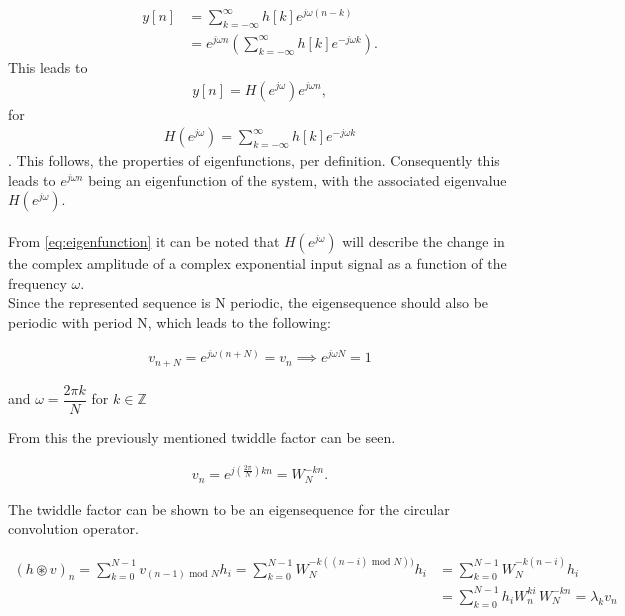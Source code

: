 \begin{align*}
y[n] 
&= \sum_{k=-\infty}^{\infty} h[k]e^{j\omega(n-k)} \nonumber \\ 
&= e^{j\omega n} \left(\sum_{k=-\infty}^{\infty} h[k]e^{-j\omega k} \right).
\end{align*}
This leads to
\begin{align}\label{eq:eigenfunction}
y[n] = H(e^{j \omega}) e^{j\omega n},
\end{align}
for
\begin{align*}
H(e^{j\omega}) = \sum_{k=-\infty}^{\infty} h[k]e^{-j\omega k} 
\end{align*}.
This follows, the properties of eigenfunctions, per definition.
Consequently this leads to $e^{j\omega n}$ being an eigenfunction of the system, with the associated eigenvalue $H(e^{j\omega})$.
\\\\
From \eqref{eq:eigenfunction} it can be noted that $H(e^{j\omega})$ will describe the change in the complex amplitude of a complex exponential input signal as a function of the frequency $\omega$. \cite{DTSP} 
\\
Since the represented sequence is N periodic, the eigensequence should also be periodic with period N, which leads to the following:

\begin{align*}
	v_{n+N} = e^{j\omega (n+N)} = v_n \implies e^{j\omega N} = 1
\end{align*}

and $\omega = \dfrac{2 \pi k}{N}$ for $k \in \mathbb{Z}$

From this the previously mentioned twiddle factor can be seen.

\begin{align*}
	v_n = e^{j(\frac{2\pi}{N}) kn} = W_N^{-kn}.
\end{align*}\cite{FSP}

The twiddle factor can be shown to be an eigensequence for the circular convolution operator.

\begin{align*}
	(h\circledast v)_n 
	= \sum_{k=0}^{N-1} v_{(n-1)\text{ mod }N}h_i 
	= \sum_{k=0}^{N-1} W_N^{-k((n-i) \text{ mod } N))}h_i
	&= \sum_{k=0}^{N-1} W_N^{-k(n-i)}h_i\\
	&= \sum_{k=0}^{N-1} h_i W_n^{ki} \, W_N^{-kn}
	= \lambda_k v_n
\end{align*}


